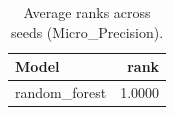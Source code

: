\begin{table}[t]
\centering
\begin{tabular}{lr}
\toprule
Model & rank \\
\midrule
random_forest & 1.0000 \\
\bottomrule
\end{tabular}
\caption{Average ranks across seeds (Micro_Precision).}
\label{tab:avg_rank_Micro_Precision}
\end{table}